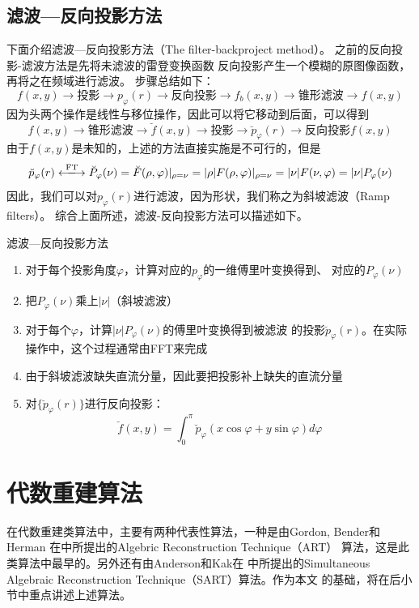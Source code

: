 \subsection{滤波—反向投影方法}
下面介绍滤波—反向投影方法（The filter-backproject method）。
之前的反向投影-滤波方法是先将未滤波的雷登变换函数
反向投影产生一个模糊的原图像函数，再将之在频域进行滤波。
步骤总结如下：
\begin{equation*}
f(x,y)\rightarrow\boxed{\text{投影}}
\rightarrow p_\varphi(r)\rightarrow\boxed{\text{反向投影}}
\rightarrow f_b(x,y)\rightarrow\boxed{\text{锥形滤波}}\rightarrow
f(x,y)
\end{equation*}
因为头两个操作是线性与移位操作，因此可以将它移动到后面，可以得到
\begin{equation*}
f(x,y)\rightarrow\boxed{\text{锥形滤波}}\rightarrow
\breve{f}(x,y)\rightarrow\boxed{\text{投影}}
\rightarrow \breve{p}_\varphi(r)\rightarrow\boxed{\text{反向投影}}
f(x,y)
\end{equation*}
由于$f(x,y)$是未知的，上述的方法直接实施是不可行的，但是
\begin{equation*}
\breve{p}_\varphi(r)\xlongleftrightarrow{\text{FT}}{}
\breve{P}_\varphi(\nu)=\breve{F}(\rho,\varphi)\arrowvert_{\rho=\nu}
=|\rho|F(\rho,\varphi)\arrowvert_{\rho=\nu}=|\nu|F(\nu,\varphi)=|\nu|P_\varphi(\nu)
\end{equation*}
因此，我们可以对$p_\varphi(r)$进行滤波，因为形状，我们称之为斜坡滤波（Ramp filters）。
综合上面所述，滤波-反向投影方法可以描述如下。
\begin{algo}
滤波—反向投影方法
\begin{enumerate}
\item{对于每个投影角度$\varphi$，计算对应的$p_\varphi$的一维傅里叶变换得到、
对应的$P_\varphi(\nu)$}
\item{把$P_\varphi(\nu)$乘上$|\nu|$（斜坡滤波）}
\item{对于每个$\varphi$，计算$|\nu|P_\varphi(\nu)$的傅里叶变换得到被滤波
的投影$\breve{p}_\varphi(r)$。在实际操作中，这个过程通常由FFT来完成}
\item{由于斜坡滤波缺失直流分量，因此要把投影补上缺失的直流分量}
\item{对$\{\breve{p}_\varphi(r)\}$进行反向投影：
\begin{equation*}
\breve{f}(x,y)=\int^\pi_0\breve{p}_\varphi(x\cos\varphi+y\sin\varphi)d\varphi
\end{equation*}}
\end{enumerate}
\end{algo}
\section{代数重建算法}
在代数重建类算法中，主要有两种代表性算法，一种是由Gordon, Bender和Herman
在\cite{gordon1970algebraic}中所提出的Algebric Reconstruction Technique（ART）
算法，这是此类算法中最早的。另外还有由Anderson和Kak在\cite{andersen1984simultaneous}
中所提出的Simultaneous Algebraic Reconstruction Technique（SART）算法。作为本文
的基础，将在后小节中重点讲述上述算法。


